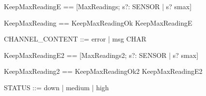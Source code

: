 \begin{zed}
[SENSOR]
\end{zed}



\begin{zed}
KeepMaxReadingE == [\Xi MaxReadings; s?: SENSOR | s? \notin \dom smax]
\end{zed}

\begin{zed}
KeepMaxReading == KeepMaxReadingOk \lor KeepMaxReadingE
\end{zed}


\begin{zed}
[CHAR] \also
CHANNEL_CONTENT ::= error | msg \ldata \seq CHAR \rdata
\end{zed}



\begin{zed}
KeepMaxReadingE2 == [\Xi MaxReadings2; s?: SENSOR | s? \notin \dom smax]
\end{zed}

\begin{zed}
KeepMaxReading2 == KeepMaxReadingOk2 \lor KeepMaxReadingE2 
\end{zed}


\begin{zed}
STATUS ::= down | medium | high
\end{zed}

